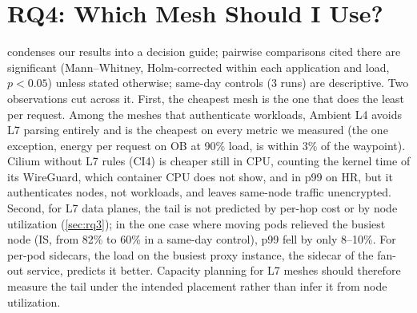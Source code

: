 \section{RQ4: Which Mesh Should I Use?}
\label{sec:rq4}

 condenses our results into a decision guide; pairwise
comparisons cited there are significant (Mann--Whitney, Holm-corrected within
each application and load, $p<0.05$) unless stated otherwise; same-day
controls (3 runs) are descriptive. Two observations
cut across it. First, the cheapest mesh is the one that does the least per
request. Among the meshes that authenticate workloads, Ambient L4 avoids L7
parsing entirely and is the cheapest on every metric we measured (the one
exception, energy per request on OB at 90\% load, is within 3\% of the
waypoint). Cilium without L7 rules (CI4) is cheaper still in CPU, counting the
kernel time of its WireGuard, which container CPU does not show, and in p99 on
HR, but it authenticates nodes, not workloads, and leaves same-node traffic
unencrypted.
Second, for L7 data planes, the tail is not predicted by per-hop cost or by
node utilization (\cref{sec:rq3}); in the one case where moving pods
relieved the busiest node (IS, from 82\% to 60\% in a same-day control), p99
fell by only 8--10\%. For per-pod sidecars, the load on the busiest proxy
instance, the sidecar of the fan-out service, predicts it better. Capacity
planning for L7 meshes should therefore measure the tail under the intended
placement rather than infer it from node utilization.

